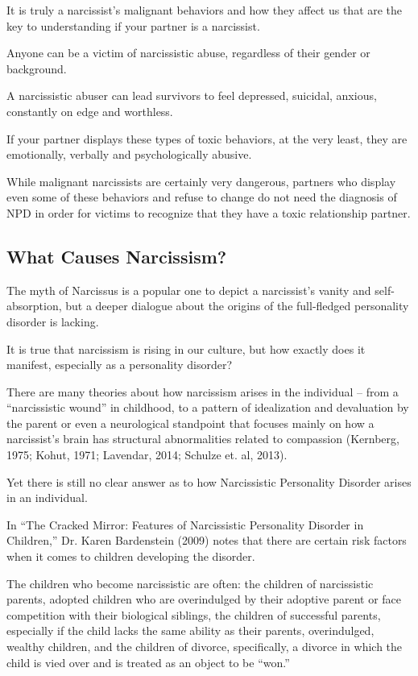 \documentclass[oneside]{book}
\numberwithin{equation}{section}
\begin{document}
It is truly a narcissist's malignant behaviors and how they affect us that are the key to understanding if your partner is a narcissist.

Anyone can be a victim of narcissistic abuse, regardless of their gender or background.

A narcissistic abuser can lead survivors to feel depressed, suicidal, anxious, constantly on edge and worthless.

If your partner displays these types of toxic behaviors, at the very least, they are emotionally, verbally and psychologically abusive.

While malignant narcissists are certainly very dangerous, partners who display even some of these behaviors and refuse to change do not need the diagnosis of NPD in order for victims to recognize that they have a toxic relationship partner.

\subsection{What Causes Narcissism?}
The myth of Narcissus is a popular one to depict a narcissist's vanity and self-absorption, but a deeper dialogue about the origins of the full-fledged personality disorder is lacking.

It is true that narcissism is rising in our culture, but how exactly does it manifest, especially as a personality disorder?

There are many theories about how narcissism arises in the individual -- from a ``narcissistic wound'' in childhood, to a pattern of idealization and devaluation by the parent or even a neurological standpoint that focuses mainly on how a narcissist's brain has structural abnormalities related to compassion (Kernberg, 1975; Kohut, 1971; Lavendar, 2014; Schulze et. al, 2013).

Yet there is still no clear answer as to how Narcissistic Personality Disorder arises in an individual.

%
In ``The Cracked Mirror: Features of Narcissistic Personality Disorder in Children,'' Dr. Karen Bardenstein (2009) notes that there are certain risk factors when it comes to children developing the disorder.

The children who become narcissistic are often: the children of narcissistic parents, adopted children who are overindulged by their adoptive parent or face competition with their biological siblings, the children of successful parents, especially if the child lacks the same ability as their parents, overindulged, wealthy children, and the children of divorce, specifically, a divorce in which the child is vied over and is treated as an object to be ``won.''
\end{document}
